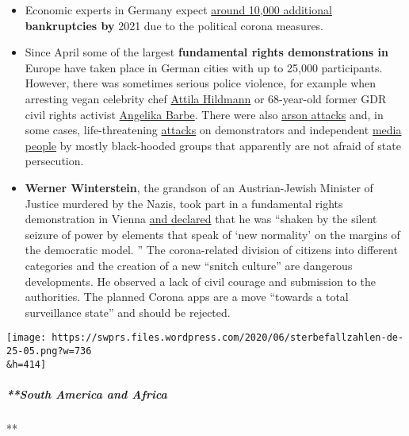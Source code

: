 \begin{itemize}
{  dramatically''} in the first quarter.
\item
  Economic experts in Germany expect
  \href{https://www.focus.de/finanzen/news/konjunktur/insgesamt-fast-30-000-insolvenzen-in-deutschland-experten-geben-erste-schaetzung-ab-corona-treibt-10-000-deutsche-firmen-in-die-pleite_id_12003269.html}{around
  10,000 additional} \textbf{bankruptcies by} 2021 due to the political
  corona measures.
\item
  Since April some of the largest \textbf{fundamental rights
  demonstrations in} Europe have taken place in German cities with up to
  25,000 participants. However, there was sometimes serious police
  violence, for example when arresting vegan celebrity chef
  \href{https://www.youtube.com/watch?v=20HIEEQtyZ8}{Attila Hildmann} or
  68-year-old former GDR civil rights activist
  \href{https://www.youtube.com/watch?v=fCbgVFRCnTc}{Angelika Barbe}.
  There were also
  \href{https://www.swr.de/swraktuell/baden-wuerttemberg/spreng-anschlag-100.html}{arson
  attacks} and, in some cases, life-threatening
  \href{https://www.swr.de/swraktuell/baden-wuerttemberg/stuttgart/corona-demo-in-stuttgart-ermittlungen-wegen-versuchter-toetung-100.html}{attacks}
  on demonstrators and independent
  \href{https://kenfm.de/anschlagsversuch-auf-ken-jebsen-tagesdosis-9-6-2020/}{media
  people} by mostly black-hooded groups that apparently are not afraid
  of state persecution.
\item
  \textbf{Werner Winterstein}, the grandson of an Austrian-Jewish
  Minister of Justice murdered by the Nazis, took part in a fundamental
  rights demonstration in Vienna \href{https://vimeo.com/418039066}{and
  declared} that he was ``shaken by the silent seizure of power by
  elements that speak of `new normality' on the margins of the
  democratic model. '' The corona-related division of citizens into
  different categories and the creation of a new ``snitch culture'' are
  dangerous developments. He observed a lack of civil courage and
  submission to the authorities. The planned Corona apps are a move
  ``towards a total surveillance state'' and should be rejected.
\end{itemize}

\texttt{[image: https://swprs.files.wordpress.com/2020/06/sterbefallzahlen-de-25-05.png?w=736\\\&h=414]}

\hypertarget{south-america-and-africa}{%
\subparagraph{**South America and
Africa}\label{south-america-and-africa}}

**

